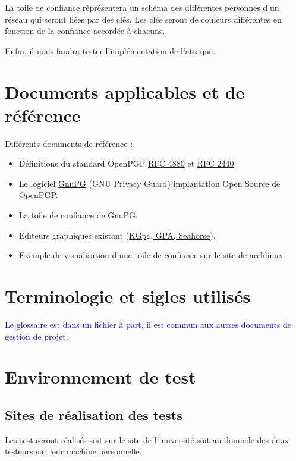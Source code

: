 \documentclass{../res/univ-projet}
\begin{document}
La toile de confiance réprésentera un schéma des différentes personnes d'un réseau qui seront liées par des clés.
Les clés seront de couleurs différentes en fonction de la confiance accordée à chacuns.

Enfin, il nous faudra tester l'implémentation de l'attaque. 


\section{Documents applicables et de référence}
Différents documents de référence :
\begin{itemize}
\item Définitions du standard OpenPGP \href{file:../../ressources/openPGP/rfc4880-en.pdf}{RFC 4880}
  et \href{file:../../ressources/openPGP/rfc2440-fr.pdf}{RFC 2440}.
\item Le logiciel \href{https://www.gnupg.org/}{GnuPG} (GNU Privacy Guard) implantation Open Source
  de OpenPGP.
\item La \href{https://www.gnupg.org/gph/fr/manual.html#AEN541}{toile de confiance} de GnuPG.
\item Editeurs graphiques existant
  (\href{http://www.gnupg.org/related_software/frontends.en.html}{KGpg, GPA, Seahorse}).
\item Exemple de visualisation d'une toile de confiance sur le site de 
  \href{https://www.archlinux.org/master-keys/#visualization}{archlinux}.
\end{itemize}

\section{Terminologie et sigles utilisés}
\textcolor{blue}{
  Le glossaire est dans un fichier à part, il est commun aux autres documents de gestion de projet.
}

\section{Environnement de test}
\subsection{Sites de réalisation des tests}
Les test seront réalisés soit sur le site de l'université soit au domicile des deux testeurs sur leur machine personnelle.
\end{document}
